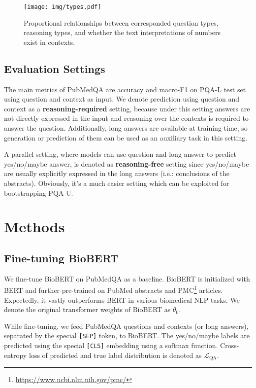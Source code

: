 \documentclass[11pt,a4paper]{article}
\begin{document}
\begin{figure}
    \centering
    \texttt{[image: img/types.pdf]}
    \vskip -0.15cm
    \caption{Proportional relationships between corresponded question types, reasoning types, and whether the text interpretations of numbers exist in contexts.}
    \label{fig:type}
\end{figure}

\subsection{Evaluation Settings}
The main metrics of PubMedQA are accuracy and macro-F1 on PQA-L test set using question and context as input. We denote prediction using question and context as a \textbf{reasoning-required} setting, because under this setting answers are not directly expressed in the input and reasoning over the contexts is required to answer the question. Additionally, long answers are available at training time, so generation or prediction of them can be used as an auxiliary task in this setting.

A parallel setting, where models can use question and long answer to predict yes/no/maybe answer, is denoted as \textbf{reasoning-free} setting since yes/no/maybe are usually explicitly expressed in the long answers (i.e.: conclusions of the abstracts). Obviously, it's a much easier setting which can be exploited for bootstrapping PQA-U.

\section{Methods}

\subsection{Fine-tuning BioBERT}
We fine-tune BioBERT \cite{lee2019biobert} on PubMedQA as a baseline. BioBERT is initialized with BERT \cite{devlin2018bert} and further pre-trained on PubMed abstracts and PMC\footnote{\url{https://www.ncbi.nlm.nih.gov/pmc/}} articles. Expectedly, it vastly outperforms BERT in various biomedical NLP tasks. We denote the original transformer weights of BioBERT as $\theta_0$.

While fine-tuning, we feed PubMedQA questions and contexts (or long answers), separated by the special {\tt [SEP]} token, to BioBERT. The yes/no/maybe labels are predicted using the special {\tt [CLS]} embedding using a softmax function. Cross-entropy loss of predicted and true label distribution is denoted as $\mathcal{L}_\text{QA}$.
\end{document}
